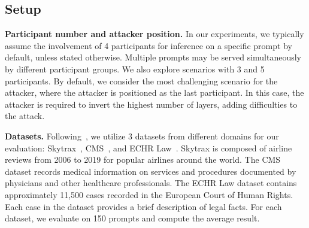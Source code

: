 \subsection{Setup}
\noindent
\textbf{Participant number and attacker position.} 
In our experiments, we typically assume the involvement of 4 participants for inference on a specific prompt by default, unless stated otherwise. 
Multiple prompts may be served simultaneously by different participant groups. We also explore scenarios with 3 and 5 participants. 
By default, we consider the most challenging scenario for the attacker, where the attacker is positioned as the last participant. In this case, the attacker is required to invert the highest number of layers, adding difficulties to the attack.



\noindent \textbf{Datasets.} 
Following~\cite{pan2020privacy,Sentence_inference_attack}, we utilize 3 datasets from different domains for our evaluation: Skytrax~\cite{skytrax}, CMS~\cite{cms}, and ECHR Law~\cite{echr}. Skytrax is composed of airline reviews from 2006 to 2019 for popular airlines around the world. The CMS dataset records medical information on services and procedures documented by physicians and other healthcare professionals. The ECHR Law dataset contains approximately 11,500 cases recorded in the European Court of Human Rights. Each case in the dataset provides a brief description of legal facts. For each dataset, we evaluate on 150 prompts and compute the average result.





